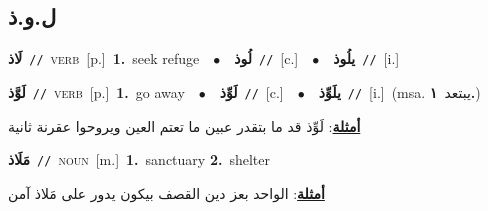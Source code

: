 \documentclass[10pt,a4paper,twoside]{article} %
\begin{document}
\begin{multicols}{2}
\vspace{-3mm}
\subsection*{\color{blue}\foreignlanguage{arabic}{ل.و.ذ}\color{blue}{}} 

{\setlength\topsep{0pt}\textbf{\foreignlanguage{arabic}{لَاذ}}\ {\color{gray}\texttt{//}\color{black}}\ \textsc{verb}\ [p.]\ \textbf{1.}~seek refuge\ \ $\bullet$\ \ \setlength\topsep{0pt}\textbf{\foreignlanguage{arabic}{لُوذ}}\ {\color{gray}\texttt{//}\color{black}}\ [c.]\ \ $\bullet$\ \ \setlength\topsep{0pt}\textbf{\foreignlanguage{arabic}{يلُوذ}}\ {\color{gray}\texttt{//}\color{black}}\ [i.]\ } \vspace{2mm}

{\setlength\topsep{0pt}\textbf{\foreignlanguage{arabic}{لَوَّذ}}\ {\color{gray}\texttt{//}\color{black}}\ \textsc{verb}\ [p.]\ \textbf{1.}~go away\ \ $\bullet$\ \ \setlength\topsep{0pt}\textbf{\foreignlanguage{arabic}{لَوِّذ}}\ {\color{gray}\texttt{//}\color{black}}\ [c.]\ \ $\bullet$\ \ \setlength\topsep{0pt}\textbf{\foreignlanguage{arabic}{يلَوِّذ}}\ {\color{gray}\texttt{//}\color{black}}\ [i.]\ \color{gray}(msa. \foreignlanguage{arabic}{يبتعد}~\foreignlanguage{arabic}{\textbf{١.}})\color{black}\  \begin{flushright}\color{gray}\foreignlanguage{arabic}{\textbf{\underline{\foreignlanguage{arabic}{أمثلة}}}: لَوِّذ قد ما بتقدر عبين ما تعتم العين ويروحوا عقرنة ثانية}\end{flushright}\color{black}} \vspace{2mm}

{\setlength\topsep{0pt}\textbf{\foreignlanguage{arabic}{مَلَاذ}}\ {\color{gray}\texttt{//}\color{black}}\ \textsc{noun}\ [m.]\ \textbf{1.}~sanctuary  \textbf{2.}~shelter\  \begin{flushright}\color{gray}\foreignlanguage{arabic}{\textbf{\underline{\foreignlanguage{arabic}{أمثلة}}}: الواحد بعز دين القصف بيكون يدور على مَلاذ آمن}\end{flushright}\color{black}} \vspace{2mm}


\end{multicols}
\end{document}
